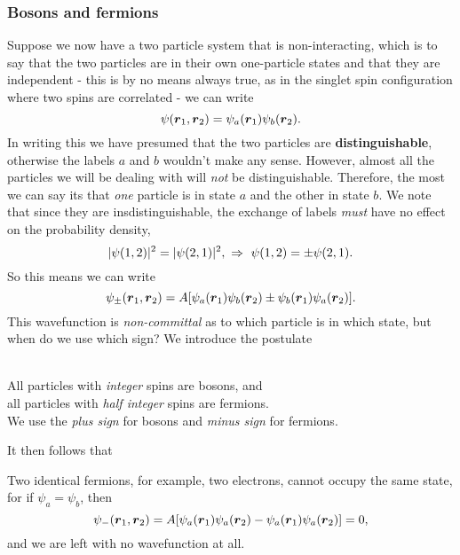 \subsubsection{Bosons and fermions}
Suppose we now have a two particle system that is non-interacting, which is to 
say that the two particles are in their own one-particle states and that they 
are independent - this is by no means always true, as in the singlet spin 
configuration where two spins are correlated - we can write
\begin{equation}
\psi(\boldsymbol{r}_1,\boldsymbol{r}_2)=\psi_a(\boldsymbol{r}_1)\psi_b(\boldsymbol{r}_2).
\end{equation}
In writing this we have presumed that the two particles are 
\textbf{distinguishable}, otherwise the labels $a$ and $b$ wouldn't make any 
sense. However, almost all the particles we will be dealing with will 
\textit{not} be distinguishable. Therefore, the most we can say its that 
\textit{one} particle is in state $a$ and the other in state $b$. 
We note that since they are insdistinguishable, the exchange of labels 
\textit{must} have no effect on the probability density, \ie
\begin{equation}
|\psi(1,2)|^2=|\psi(2,1)|^2,\ \imp\ \psi(1,2)=\pm\psi(2,1).
\end{equation}
So this means we can write
\begin{equation}
\psi_{\pm}(\boldsymbol{r}_1,\boldsymbol{r}_2)=A[\psi_a(\boldsymbol{r}_1)\psi_b(\boldsymbol{r}_2)\pm\psi_b(\boldsymbol{r}_1)\psi_a(\boldsymbol{r}_2)]. 
\end{equation}
This wavefunction is \textit{non-committal} as to which particle is in which 
state, but when do we use which sign? We introduce the postulate
\begin{post}
\ \\
All particles with \textit{integer} spins are bosons, and\\
all particles with \textit{half integer} spins are fermions. \\
We use the \textit{plus sign} for bosons and \textit{minus sign} for fermions. 
\end{post}
It then follows that 
\begin{thrm}
Two identical fermions, for example, two electrons, cannot occupy the same state, 
for if $\psi_a=\psi_b$, then 
\begin{equation}
\psi_-(\boldsymbol{r}_1,\boldsymbol{r}_2)=A[\psi_a(\boldsymbol{r}_1)\psi_a(\boldsymbol{r}_2)-\psi_a(\boldsymbol{r}_1)\psi_a(\boldsymbol{r}_2)]=0,
\end{equation}
and we are left with no wavefunction at all. 
\end{thrm}
